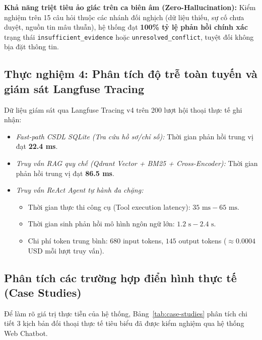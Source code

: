 \documentclass[a4paper,11pt]{article}
\begin{document}
\textbf{Khả năng triệt tiêu ảo giác trên ca biên âm (Zero-Hallucination):} Kiểm nghiệm trên 15 câu hỏi thuộc các nhánh đối nghịch (dữ liệu thiếu, sự cố chưa duyệt, nguồn tin mâu thuẫn), hệ thống đạt \textbf{100\% tỷ lệ phản hồi chính xác} trạng thái \nolinkurl{insufficient_evidence} hoặc \nolinkurl{unresolved_conflict}, tuyệt đối không bịa đặt thông tin.

\subsection{Thực nghiệm 4: Phân tích độ trễ toàn tuyến và giám sát Langfuse Tracing}
\label{sec:eval-latency}
Dữ liệu giám sát qua Langfuse Tracing v4 trên 200 lượt hội thoại thực tế ghi nhận:
\begin{itemize}[leftmargin=1.5em,noitemsep]
    \item \textit{Fast-path CSDL SQLite (Tra cứu hồ sơ/chỉ số):} Thời gian phản hồi trung vị đạt \textbf{22.4 ms}.
    \item \textit{Truy vấn RAG quy chế (Qdrant Vector + BM25 + Cross-Encoder):} Thời gian phản hồi trung vị đạt \textbf{86.5 ms}.
    \item \textit{Truy vấn ReAct Agent tự hành đa chặng:}
    \begin{itemize}[noitemsep]
        \item Thời gian thực thi công cụ (Tool execution latency): $35\text{ ms} - 65\text{ ms}$.
        \item Thời gian sinh phản hồi mô hình ngôn ngữ lớn: $1.2\text{ s} - 2.4\text{ s}$.
        \item Chi phí token trung bình: $680$ input tokens, $145$ output tokens ($\approx 0.0004$ USD mỗi lượt truy vấn).
    \end{itemize}
\end{itemize}

\subsection{Phân tích các trường hợp điển hình thực tế (Case Studies)}
\label{sec:case-studies}

Để làm rõ giá trị thực tiễn của hệ thống, Bảng~\ref{tab:case-studies} phân tích chi tiết 3 kịch bản đối thoại thực tế tiêu biểu đã được kiểm nghiệm qua hệ thống Web Chatbot.
\end{document}
